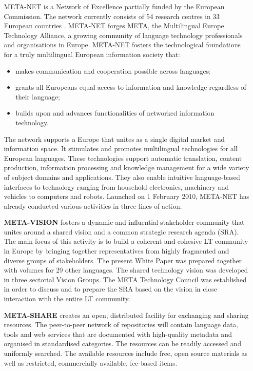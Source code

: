 \begin{multicols}{2}

META-NET is a Network of Excellence partially funded by the European Commission. The network currently consists of 54 research centres in 33 European countries \cite{rehm2011}. META-NET forges META, the Multilingual Europe Technology Alliance, a growing community of language technology professionals and organisations in Europe. META-NET fosters the technological foundations for a truly multilingual European information society that:

\begin{itemize}
\item makes communication and cooperation possible across languages;
\item grants all Europeans equal access to information and knowledge regardless of their language;
\item builds upon and advances functionalities of networked information technology.
\end{itemize}

The network supports a Europe that unites as a single digital market and information space. It stimulates and promotes multilingual technologies for all European languages. These technologies support automatic translation, content production, information processing and knowledge management for a wide variety of subject domains and applications. They also enable intuitive language-based interfaces to technology ranging from household electronics, machinery and vehicles to computers and robots.
Launched on 1 February 2010, META-NET has already conducted various activities in three lines of action.

\textbf{META-VISION} fosters a dynamic and influential stakeholder community that unites around a shared vision and a common strategic research agenda (SRA). The main focus of this activity is to build a coherent and cohesive LT community in Europe by bringing together representatives from highly fragmented and diverse groups of stakeholders. The present White Paper was prepared together with volumes for 29 other languages. The shared technology vision was developed in three sectorial Vision Groups. The META Technology Council was established in order to discuss and to prepare the SRA based on the vision in close interaction with the entire LT community.

\textbf{META-SHARE} creates an open, distributed facility for exchanging and sharing resources. The peer-to-peer network of repositories will contain language data, tools and web services that are documented with high-quality metadata and organised in standardised categories. The resources can be readily accessed and uniformly searched. The available resources include free, open source materials as well as restricted, commercially available, fee-based items.


\end{multicols}
